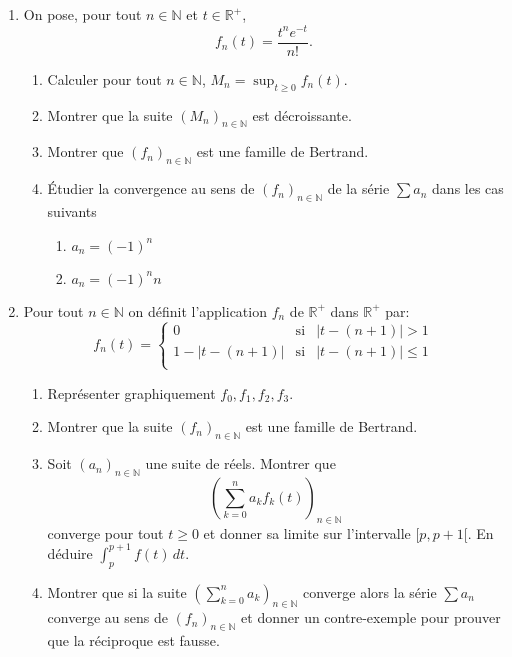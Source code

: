 \begin{enumerate}
\item On pose, pour tout $n\in \mathbb{N}$ et $t\in \mathbb{R}^{+}$,
$$f_{n}(t)=\frac{t^{n}e^{-t}}{n!}.$$

\begin{enumerate}
\item Calculer pour tout $n\in \mathbb{N}$, $M_{n}=\sup_{t\geq 0}f_{n}(t)$.
\item Montrer que la suite $(M_n)_{n\in \mathbb{N}}$ est décroissante.
\item Montrer que $(f_n)_{n\in \mathbb{N}}$ est une famille de Bertrand.
\item Étudier la convergence au sens de $(f_{n})_{n\in \mathbb{N}}$ de la série $\sum a_{n}$ dans les cas suivants
\begin{enumerate}
\item $a_{n}=(-1)^{n}$
\item $a_{n}=(-1)^{n}n$
\end{enumerate}
\end{enumerate}

\item Pour tout $n\in \mathbb{N}$ on définit l'application $f_{n}$ de $\mathbb{R}^{+}$ dans $\mathbb{R}^{+}$ par:
\[f_{n}(t)=\left \{
\begin{array}{ccc}
0 & \mathrm{si} & |t-(n+1)|>1\\
1-|t-(n+1)| & \mathrm{si} & |t-(n+1)| \leq 1 \\
\end{array}
\right .
\]
\begin{enumerate}
\item Représenter graphiquement $f_{0},f_{1},f_{2},f_{3}$.
\item Montrer que la suite $(f_n)_{n\in \mathbb{N}}$ est une famille de Bertrand.
\item Soit $(a_n)_{n\in \mathbb{N}}$ une suite de réels. Montrer que $$(\sum _{k=0}^{n}a_{k}f_{k}(t))_{n\in \mathbb{N}}$$ converge pour tout $t\geq 0$ et donner sa limite sur l'intervalle $[p,p+1[$. En déduire $\int_{p}^{p+1}f(t)\,dt$.
\item Montrer que si la suite $(\sum _{k=0}^{n}a_k)_{n\in \mathbb{N}}$ converge alors la série $\sum a_{n}$ converge au sens de $(f_n)_{n\in \mathbb{N}}$ et donner un contre-exemple pour prouver que la réciproque est fausse.
\end{enumerate}

\end{enumerate}


